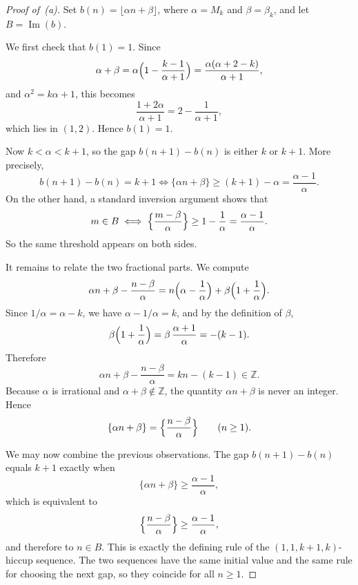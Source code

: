 \documentclass[11pt]{article}
\numberwithin{equation}{section}
\theoremstyle{plain}
\theoremstyle{definition}
\theoremstyle{remark}
\newcommand{\Z}{\mathbb{Z}}
\begin{document}
\begin{proof}[Proof of~\textup{(a)}]
Set $b(n)=\lfloor \alpha n+\beta\rfloor$, where $\alpha=M_k$ and
$\beta=\beta_k$, and let $B=\operatorname{Im}(b)$.

We first check that $b(1)=1$.  Since
\[
\alpha+\beta
=\alpha\Bigl(1-\frac{k-1}{\alpha+1}\Bigr)
=\frac{\alpha(\alpha+2-k)}{\alpha+1},
\]
and $\alpha^2=k\alpha+1$, this becomes
\[
\frac{1+2\alpha}{\alpha+1}
=2-\frac{1}{\alpha+1},
\]
which lies in $(1,2)$.  Hence $b(1)=1$.

Now $k<\alpha<k+1$, so the gap $b(n+1)-b(n)$ is either $k$ or $k+1$.
More precisely,
\[
b(n+1)-b(n)=k+1
\iff \{\alpha n+\beta\}\ge (k+1)-\alpha
=\frac{\alpha-1}{\alpha}.
\]
On the other hand, a standard inversion argument shows that
\[
m\in B
\iff \Bigl\{\frac{m-\beta}{\alpha}\Bigr\}\ge 1-\frac1\alpha
=\frac{\alpha-1}{\alpha}.
\]
So the same threshold appears on both sides.

It remains to relate the two fractional parts.  We compute
\[
\alpha n+\beta-\frac{n-\beta}{\alpha}
=n\Bigl(\alpha-\frac1\alpha\Bigr)
+\beta\Bigl(1+\frac1\alpha\Bigr).
\]
Since $1/\alpha=\alpha-k$, we have $\alpha-1/\alpha=k$, and by the
definition of $\beta$,
\[
\beta\Bigl(1+\frac1\alpha\Bigr)
=\beta\,\frac{\alpha+1}{\alpha}
=-(k-1).
\]
Therefore
\[
\alpha n+\beta-\frac{n-\beta}{\alpha}=kn-(k-1)\in\Z.
\]
Because $\alpha$ is irrational and $\alpha+\beta\notin\Z$, the quantity
$\alpha n+\beta$ is never an integer.  Hence
\[
\{\alpha n+\beta\}
=
\Bigl\{\frac{n-\beta}{\alpha}\Bigr\}
\qquad (n\ge1).
\]

We may now combine the previous observations.  The gap $b(n+1)-b(n)$
equals $k+1$ exactly when
\[
\{\alpha n+\beta\}\ge \frac{\alpha-1}{\alpha},
\]
which is equivalent to
\[
\Bigl\{\frac{n-\beta}{\alpha}\Bigr\}\ge \frac{\alpha-1}{\alpha},
\]
and therefore to $n\in B$.  This is exactly the defining rule of the
$(1,1,k{+}1,k)$-hiccup sequence.  The two sequences have the same
initial value and the same rule for choosing the next gap, so they
coincide for all $n\ge1$.
\end{proof}
\end{document}
